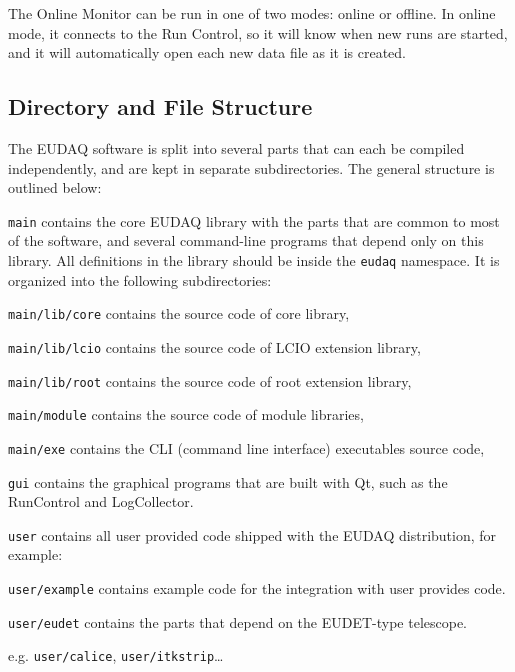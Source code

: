 The Online Monitor can be run in one of two modes: online or offline.
In online mode, it connects to the Run Control, so it will know when new runs are started,
and it will automatically open each new data file as it is created.



\subsection{Directory and File Structure}
The EUDAQ software is split into several parts that can each be compiled independently,
and are kept in separate subdirectories.
The general structure is outlined below:

\begin{myitemize}
\item \texttt{main}
  contains the core EUDAQ library with the parts that are common to most of the software,
  and several command-line programs that depend only on this library.
  All definitions in the library should be inside the \texttt{eudaq} namespace.
  It is organized into the following subdirectories:
  \begin{myitemize}
  \item \texttt{main/lib/core}
    contains the source code of core library,
  \item \texttt{main/lib/lcio}
    contains the source code of LCIO extension library,
  \item \texttt{main/lib/root}
    contains the source code of root extension library,
  \item \texttt{main/module}
    contains the source code of module libraries,
  \item \texttt{main/exe}
    contains the CLI (command line interface) executables source code,
  \end{myitemize}
\item \texttt{gui}
  contains the graphical programs that are built with Qt, such as the RunControl and LogCollector.
\item \texttt{user}
  contains all user provided code shipped with the EUDAQ
  distribution, for example:
  \begin{myitemize}
\item \texttt{user/example}
  contains example code for the integration with user provides code.
\item \texttt{user/eudet}
  contains the parts that depend on the EUDET-type telescope.
\item e.g. \texttt{user/calice}, \texttt{user/itkstrip}\ldots{}

\end{myitemize}
\end{myitemize}
